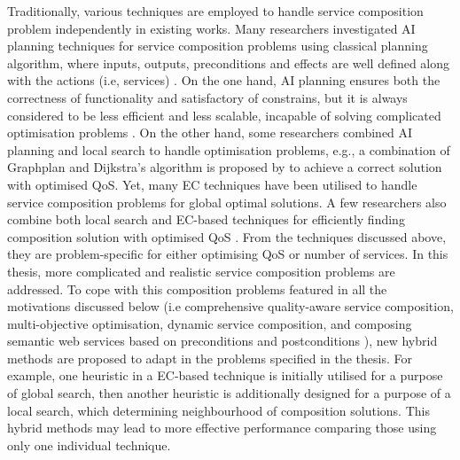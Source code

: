 Traditionally, various techniques are employed to handle service composition problem independently in existing works. Many researchers investigated AI planning techniques for service composition problems using classical planning algorithm, where inputs, outputs, preconditions and effects are well defined along with the actions (i.e, services) \cite{markou2015non,peer2005web}. On the one hand, AI planning ensures both the correctness of functionality and satisfactory of constrains, but it is always considered to be less efficient and less scalable, incapable of solving complicated optimisation problems \cite{parejo2008qos}. On the other hand, some researchers combined AI planning and local search to handle optimisation problems, e.g., a combination of Graphplan \cite{blum1997fast} and Dijkstra’s algorithm is proposed by \cite{feng2013dynamic} to achieve a correct solution with optimised QoS. Yet, many EC techniques have been utilised to handle service composition problems for global optimal solutions. A few researchers also combine both local search and EC-based techniques for efficiently finding composition solution with optimised QoS \cite{parejo2008qos}. From the techniques discussed above, they are problem-specific for either optimising QoS or number of services. In this thesis, more complicated and realistic service composition problems are addressed. To cope with this composition problems featured in all the motivations discussed below (i.e comprehensive quality-aware service composition, multi-objective optimisation, dynamic service composition, and composing semantic web services based on preconditions and postconditions ), new hybrid methods are proposed to adapt in the problems specified in the thesis. For example, one heuristic in a EC-based technique is initially utilised for a purpose of global search, then another heuristic is additionally designed for a purpose of a local search, which determining neighbourhood of composition solutions. This hybrid methods may lead to more effective performance comparing those using only one individual technique. 

